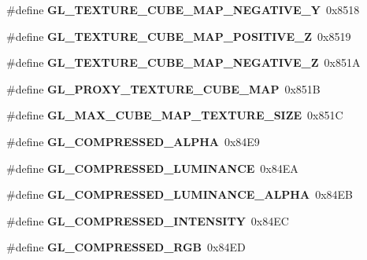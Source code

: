 \begin{DoxyCompactItemize}
\item 
\#define {\bfseries G\+L\+\_\+\+T\+E\+X\+T\+U\+R\+E\+\_\+\+C\+U\+B\+E\+\_\+\+M\+A\+P\+\_\+\+N\+E\+G\+A\+T\+I\+V\+E\+\_\+\+Y}~0x8518\label{_s_d_l__opengl_8h_a8d31f977b3490eb05832ecc261313462}

\item 
\#define {\bfseries G\+L\+\_\+\+T\+E\+X\+T\+U\+R\+E\+\_\+\+C\+U\+B\+E\+\_\+\+M\+A\+P\+\_\+\+P\+O\+S\+I\+T\+I\+V\+E\+\_\+\+Z}~0x8519\label{_s_d_l__opengl_8h_a9c63e51b23baa3e2abc01cc0c892a111}

\item 
\#define {\bfseries G\+L\+\_\+\+T\+E\+X\+T\+U\+R\+E\+\_\+\+C\+U\+B\+E\+\_\+\+M\+A\+P\+\_\+\+N\+E\+G\+A\+T\+I\+V\+E\+\_\+\+Z}~0x851\+A\label{_s_d_l__opengl_8h_a2d568ba9541df33fb21dc5bacbe7b4a3}

\item 
\#define {\bfseries G\+L\+\_\+\+P\+R\+O\+X\+Y\+\_\+\+T\+E\+X\+T\+U\+R\+E\+\_\+\+C\+U\+B\+E\+\_\+\+M\+A\+P}~0x851\+B\label{_s_d_l__opengl_8h_a2235d0c1385ca8f93745311a04e05527}

\item 
\#define {\bfseries G\+L\+\_\+\+M\+A\+X\+\_\+\+C\+U\+B\+E\+\_\+\+M\+A\+P\+\_\+\+T\+E\+X\+T\+U\+R\+E\+\_\+\+S\+I\+Z\+E}~0x851\+C\label{_s_d_l__opengl_8h_a632039148b57b1df2b23f1ef1c94de34}

\item 
\#define {\bfseries G\+L\+\_\+\+C\+O\+M\+P\+R\+E\+S\+S\+E\+D\+\_\+\+A\+L\+P\+H\+A}~0x84\+E9\label{_s_d_l__opengl_8h_a1d4cae88f55b01dc32912907caf0e388}

\item 
\#define {\bfseries G\+L\+\_\+\+C\+O\+M\+P\+R\+E\+S\+S\+E\+D\+\_\+\+L\+U\+M\+I\+N\+A\+N\+C\+E}~0x84\+E\+A\label{_s_d_l__opengl_8h_a48550b692c808f2770a7c4953d574c6b}

\item 
\#define {\bfseries G\+L\+\_\+\+C\+O\+M\+P\+R\+E\+S\+S\+E\+D\+\_\+\+L\+U\+M\+I\+N\+A\+N\+C\+E\+\_\+\+A\+L\+P\+H\+A}~0x84\+E\+B\label{_s_d_l__opengl_8h_a7b67d430c0f3c1a6b370946a4993dc91}

\item 
\#define {\bfseries G\+L\+\_\+\+C\+O\+M\+P\+R\+E\+S\+S\+E\+D\+\_\+\+I\+N\+T\+E\+N\+S\+I\+T\+Y}~0x84\+E\+C\label{_s_d_l__opengl_8h_a9bb9ee74b17675d2eb85780c9eb30e76}

\item 
\#define {\bfseries G\+L\+\_\+\+C\+O\+M\+P\+R\+E\+S\+S\+E\+D\+\_\+\+R\+G\+B}~0x84\+E\+D\label{_s_d_l__opengl_8h_a6d53cfb9b7cbe9abb9253afcea445b04}


\end{DoxyCompactItemize}
